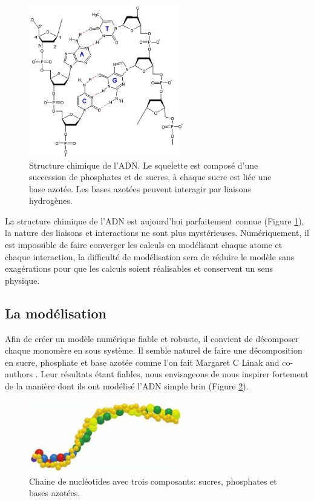 \documentclass[a4paper,11pt]{article}
\begin{document}
\begin{figure}[H]
\begin{center}
\includegraphics[width=0.6\textwidth]{adn.jpg}

\caption{Structure chimique de l'ADN. Le squelette est composé d'une succession de phosphates et de sucres, à chaque sucre est liée une base azotée. Les bases azotées peuvent interagir par liaisons hydrogènes.}
\label{adn}
\end{center}
\end{figure}

La structure chimique de l'ADN est aujourd'hui parfaitement connue (Figure \ref{adn}), la nature des liaisons et interactions ne sont plus mystérieuses. Numériquement, il est impossible de faire converger les calculs en modélisant chaque atome et chaque interaction, la difficulté de modélisation sera de réduire le modèle sans exagérations pour que les calculs soient réalisables et conservent un sens physique. 

\newpage

\subsection{La modélisation}

Afin de créer un modèle numérique fiable et robuste, il convient de décomposer chaque monomère en sous système. Il semble naturel de faire une décomposition en sucre, phosphate et base azotée comme l'on fait Margaret C Linak and co-authors \cite{jchem}. Leur résultats étant fiables, nous envisageons de nous inspirer fortement de la manière dont ils ont modélisé l'ADN simple brin (Figure \ref{dnamod}).
\begin{figure}[H]
\begin{center}
\includegraphics[width=0.6\textwidth]{dnamod.jpg}

\caption{Chaine de nucléotides avec trois composants: sucres, phosphates et bases azotées\cite{jchem}.}
\label{dnamod}
\end{center}
\end{figure}
\end{document}
